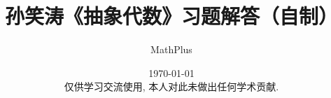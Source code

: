 \documentclass[UTF8,fontset=windows]{ctexart}
\title{孙笑涛《抽象代数》习题解答（自制）}
\author{MathPlus}
\date{
    \today
    \\[2em]
    仅供学习交流使用, 本人对此未做出任何学术贡献.
}
\theoremstyle{dotless}
\begin{document}
\maketitle
\tableofcontents


\clearpage

\clearpage

\clearpage

\clearpage

\clearpage

\nocite{*}


\end{document}

